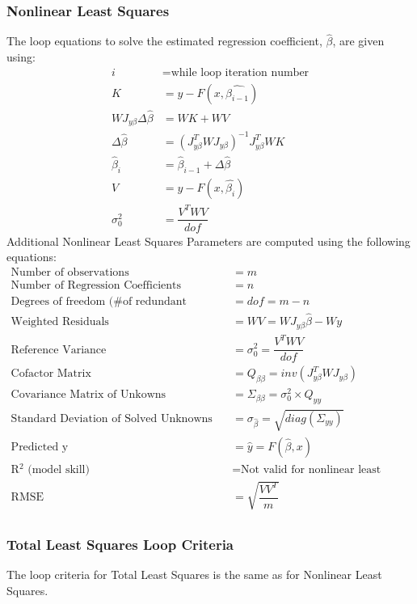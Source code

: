 \documentclass{article}
\begin{document}
	\subsubsection*{Nonlinear Least Squares}
	The loop equations to solve the estimated regression coefficient, $\hat{\beta}$, are given using:
	\begin{align*}
	i &= \text{while loop iteration number} \\
	K &= y - F(x,\hat{\beta_{i-1}}) \\
	WJ_{y\beta}\Delta\hat{\beta} &= WK + WV \\
	\Delta\hat{\beta} &= (J_{y\beta}^TWJ_{y\beta})^{-1}J_{y\beta}^TWK \\
	\hat{\beta}_i &= \hat{\beta}_{i-1} + \Delta\hat{\beta} \\
	V &= y - F(x,\hat{\beta_i}) \\
	\sigma_0^2 &= \dfrac{V^TWV}{dof}  
	\end{align*}
	Additional Nonlinear Least Squares Parameters are computed using the following equations:
	\begin{align*}
	\text{Number of observations} &= m \\ 
	\text{Number of Regression Coefficients} &= n  \\
	\text{Degrees of freedom (\# of redundant observations)} &= dof = m-n \\
	\text{Weighted Residuals} &= WV = WJ_{y\beta}\hat{\beta} - Wy\\
	\text{Reference Variance} &= \sigma_0^2 = \dfrac{V^TWV}{dof} \\
	\text{Cofactor Matrix} &= Q_{\beta\beta} = inv(J_{y\beta}^TWJ_{y\beta}) \\
	\text{Covariance Matrix of Unkowns} &= \Sigma_{\beta\beta} = \sigma_0^2 \times Q_{yy} \\
	\text{Standard Deviation of Solved Unknowns} &= \sigma_{\hat{\beta}} = \sqrt{diag(\Sigma_{yy})} \\
	\text{Predicted y} &= \hat{y} = F(\hat{\beta},x)\\
	\text{R$^2$ (model skill)} &= \text{Not valid for nonlinear least squares} \\
	\text{RMSE } &= \sqrt{\dfrac{VV^T}{m}} \\
	\end{align*}	
	\clearpage
	\subsubsection*{Total Least Squares Loop Criteria}
	The loop criteria for Total Least Squares is the same as for Nonlinear Least Squares.
\end{document}
